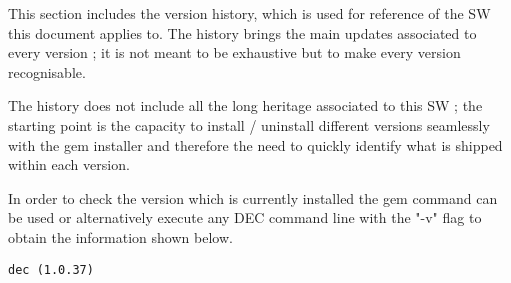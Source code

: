 \documentclass[dec_sum_main.tex]{subfiles}
\begin{document}
 
\par
\noindent
This section includes the version history, which is used for reference of the SW this document applies to. The history brings the main updates associated to every version ; it is not meant to be exhaustive but to make every version recognisable.\newline

\par
\noindent
The history does not include all the long heritage associated to this SW ; the starting point is the capacity to install / uninstall different versions seamlessly with the gem installer and therefore the need to quickly identify what is shipped within each version. \newline

\par
\noindent 
In order to check the version which is currently installed the gem command can be used or alternatively execute any DEC command line with the "-v" flag to obtain the information shown below. \newline


\begin{Verbatim}[tabsize=4]
    dec (1.0.37)
\end{Verbatim}

\end{document}

